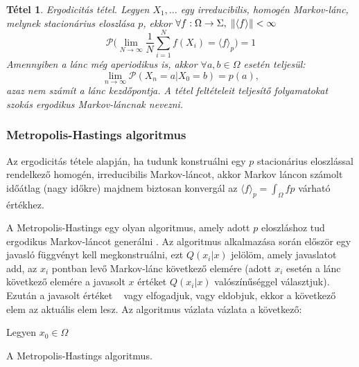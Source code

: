 \documentclass[10pt,a4paper]{article}
\numberwithin{equation}{subsection}
\numberwithin{figure}{section}
\newtheorem{theorem}{Tétel}[section]
\begin{document}
\begin{theorem}{Ergodicitás tétel.}
Legyen $X_1,\dots$ egy irreducibilis, homogén Markov-lánc, melynek stacionárius eloszlása  $p$, ekkor  
$\forall f:\Omega\rightarrow\Sigma ,\;\norm{\langle f\rangle}<\infty$
\begin{equation}
\mathcal{P}\Bigg(\lim_{N\rightarrow\infty}\frac{1}{N}\sum_{i=1}^Nf(X_i)=\langle f \rangle_p\Bigg)=1
\end{equation}
Amennyiben a lánc még aperiodikus is, akkor $\forall a,b\in\Omega$ esetén teljesül: 
\begin{equation}
\lim_{n\rightarrow\infty}\mathcal{P}(X_n=a|X_0=b) = p(a),
\end{equation}
azaz nem számít a lánc kezdőpontja. A tétel feltételeit teljesítő folyamatokat szokás ergodikus Markov-láncnak nevezni.
\end{theorem}


\subsubsection{Metropolis-Hastings algoritmus}

Az ergodicitás tétele alapján, ha tudunk konstruálni egy $p$ stacionárius eloszlással rendelkező homogén, irreducibilis Markov-láncot, akkor Markov láncon számolt időátlag (nagy időkre) majdnem biztosan konvergál az $\langle f \rangle_p=\int_\Omega fp$ várható értékhez.

A Metropolis-Hastings egy olyan algoritmus, amely adott $p$ eloszláshoz tud ergodikus Markov-láncot generálni \cite{Metropolis}. Az algoritmus alkalmazása során először egy javasló függvényt kell megkonstruálni, ezt $Q(x_i|x)$ jelölöm, amely javaslatot add, az $x_i$ pontban levő Markov-lánc következő elemére (adott $x_i$ esetén a lánc következő elemére a javasolt $x$ értéket $Q(x_i|x)$ valószínűséggel választjuk). Ezután a javasolt értéket ~ vagy elfogadjuk, vagy eldobjuk, ekkor a következő elem az aktuális elem lesz. Az algoritmus vázlata vázlata  a következő:

\begin{center}
\begin{algorithm}[H]
Legyen $x_0\in \Omega$\;
 \caption{A Metropolis-Hastings algoritmus.}
 \label{alg:MH}
\end{algorithm}
\end{center}
\end{document}
